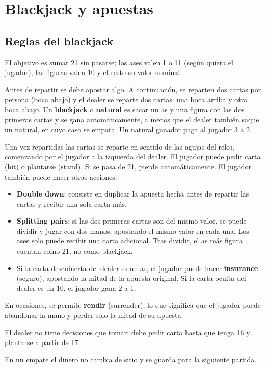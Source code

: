 \section{Blackjack y apuestas}\label{sec:blackjack}


\subsection{Reglas del blackjack}
El objetivo es sumar 21 sin pasarse; los ases valen 1 o 11 (según quiera el jugador), las figuras valen 10 y el resto su valor nominal. 

Antes de repartir se debe apostar algo. A continuación, se reparten dos cartas por persona (boca abajo) y el dealer se reparte dos cartas: una boca arriba y otra boca abajo. Un \textbf{blackjack} o \textbf{natural} es sacar un as y una figura con las dos primeras cartas y se gana automáticamente, a menos que el dealer también saque un natural, en cuyo caso se empata. Un natural ganador paga al jugador 3 a 2. 

Una vez repartidas las cartas se reparte en sentido de las agujas del reloj, comenzando por el jugador a la izquierda del dealer. El jugador puede pedir carta (hit) o plantarse (stand). Si se pasa de 21, pierde automáticamente. 
El jugador también puede hacer otras acciones:
\begin{itemize}
    \item \textbf{Double down}: consiste en duplicar la apuesta hecha antes de repartir las cartas y recibir una sola carta más.
    \item \textbf{Splitting pairs}: si las dos primeras cartas son del mismo valor, se puede dividir y jugar con dos manos, apostando el mismo valor en cada una. Los ases solo puede recibir una carta adicional. Tras dividir, el as más figura cuentan como 21, no como blackjack. 
    \item Si la carta descubierta del dealer es un as, el jugador puede hacer \textbf{insurance} (seguro), apostando la mitad de la apuesta original. Si la carta oculta del dealer es un 10, el jugador gana 2 a 1.
\end{itemize}
En ocasiones, se permite \textbf{rendir} (surrender), lo que significa que el jugador puede abandonar la mano y perder solo la mitad de su apuesta. 

El dealer no tiene decisiones que tomar: debe pedir carta hasta que tenga 16 y plantarse a partir de 17. 

En un empate el dinero no cambia de sitio y se guarda para la siguiente partida.




